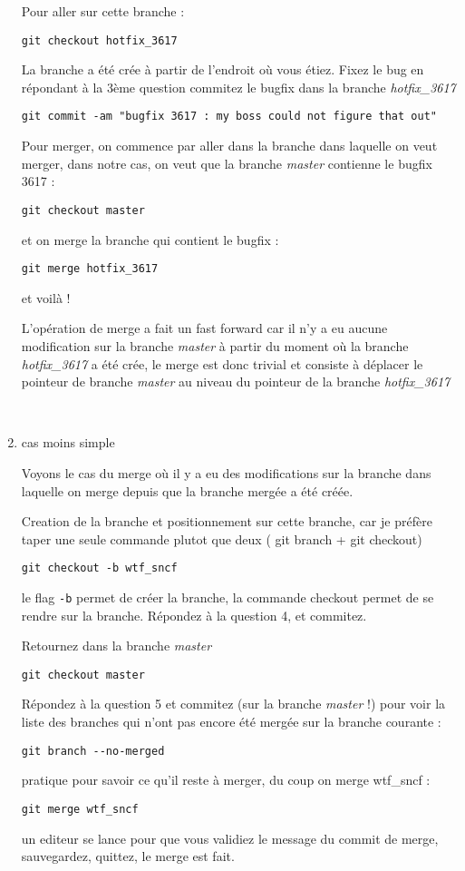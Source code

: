 \documentclass[10pt]{exam}
\begin{document}
\begin{questions}
\begin{enumerate}
Pour aller sur cette branche :
\begin{lstlisting}
git checkout hotfix_3617
\end{lstlisting}

La branche a été crée à partir de l'endroit où vous étiez.
Fixez le bug en répondant à la 3ème question
commitez le bugfix dans la branche \emph{hotfix\_3617}
\begin{lstlisting}
git commit -am "bugfix 3617 : my boss could not figure that out"
\end{lstlisting}

Pour merger, on commence par aller dans la branche dans laquelle on veut merger, dans notre cas, on veut que la branche \emph{master} contienne le bugfix 3617 :
\begin{lstlisting}
git checkout master
\end{lstlisting}
et on merge la branche qui contient le bugfix :
\begin{lstlisting}
git merge hotfix_3617
\end{lstlisting}
et voilà !

L'opération de merge a fait un fast forward car il n'y a eu aucune modification sur la branche \emph{master} à partir du moment où la branche \emph{hotfix\_3617} a été crée, le merge est donc trivial et consiste à déplacer le pointeur de branche \emph{master} au niveau du pointeur de la branche \emph{hotfix\_3617}

~

\item cas moins simple

Voyons le cas du merge où il y a eu des modifications sur la branche dans laquelle on merge depuis que la branche mergée a été créée.

Creation de la branche et positionnement sur cette branche, car je préfère taper une seule commande plutot que deux ( git branch + git checkout)
\begin{lstlisting}
git checkout -b wtf_sncf
\end{lstlisting}
le flag \texttt{-b} permet de créer la branche, la commande checkout permet de se rendre sur la branche.
Répondez à la question 4, et commitez.

Retournez dans la branche \emph{master}
\begin{lstlisting}
git checkout master
\end{lstlisting}
Répondez à la question 5 et commitez (sur la branche \emph{master} !)
%
pour voir la liste des branches qui n'ont pas encore été mergée sur la branche courante :
\begin{lstlisting}
git branch --no-merged
\end{lstlisting}
pratique pour savoir ce qu'il reste à merger, du coup on merge wtf\_sncf :
\begin{lstlisting}
git merge wtf_sncf
\end{lstlisting}
un editeur se lance pour que vous validiez le message du commit de merge, sauvegardez, quittez, le merge est fait.


\end{enumerate}
\end{questions}
\end{document}
